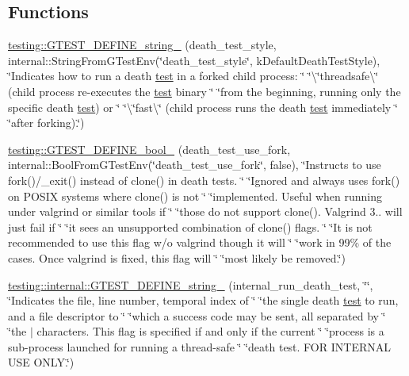 \subsection*{Functions}
\begin{DoxyCompactItemize}
\item 
\mbox{\hyperlink{namespacetesting_a62d8ec1eb3e20f20ed52604b0dfa3425}{testing\+::\+G\+T\+E\+S\+T\+\_\+\+D\+E\+F\+I\+N\+E\+\_\+string\+\_\+}} (death\+\_\+test\+\_\+style, internal\+::\+String\+From\+G\+Test\+Env(\char`\"{}death\+\_\+test\+\_\+style\char`\"{}, k\+Default\+Death\+Test\+Style), \char`\"{}Indicates how to run a death \mbox{\hyperlink{_mutual_8h_a707ee03719e99670bf6cfdfd897b8456}{test}} in a forked child process\+: \char`\"{} \char`\"{}\textbackslash{}\char`\"{}threadsafe\textbackslash{}\char`\"{} (child process re-\/executes the \mbox{\hyperlink{_mutual_8h_a707ee03719e99670bf6cfdfd897b8456}{test}} binary \char`\"{} \char`\"{}from the beginning, running only the specific death \mbox{\hyperlink{_mutual_8h_a707ee03719e99670bf6cfdfd897b8456}{test}}) or \char`\"{} \char`\"{}\textbackslash{}\char`\"{}fast\textbackslash{}\char`\"{} (child process runs the death \mbox{\hyperlink{_mutual_8h_a707ee03719e99670bf6cfdfd897b8456}{test}} immediately \char`\"{} \char`\"{}after forking).\char`\"{})
\item 
\mbox{\hyperlink{namespacetesting_a428e5944490e497df683cb8324ce4489}{testing\+::\+G\+T\+E\+S\+T\+\_\+\+D\+E\+F\+I\+N\+E\+\_\+bool\+\_\+}} (death\+\_\+test\+\_\+use\+\_\+fork, internal\+::\+Bool\+From\+G\+Test\+Env(\char`\"{}death\+\_\+test\+\_\+use\+\_\+fork\char`\"{}, false), \char`\"{}Instructs to use fork()/\+\_\+exit() instead of clone() in death tests. \char`\"{} \char`\"{}Ignored and always uses fork() on P\+O\+S\+IX systems where clone() is not \char`\"{} \char`\"{}implemented. Useful when running under valgrind or similar tools if \char`\"{} \char`\"{}those do not support clone(). Valgrind 3.. will just fail if \char`\"{} \char`\"{}it sees an unsupported combination of clone() flags. \char`\"{} \char`\"{}It is not recommended to use this flag w/o valgrind though it will \char`\"{} \char`\"{}work in 99\% of the cases. Once valgrind is fixed, this flag will \char`\"{} \char`\"{}most likely be removed.\char`\"{})
\item 
\mbox{\hyperlink{namespacetesting_1_1internal_a20bfd9d47d8dd167ffc1c37a4c9ff73e}{testing\+::internal\+::\+G\+T\+E\+S\+T\+\_\+\+D\+E\+F\+I\+N\+E\+\_\+string\+\_\+}} (internal\+\_\+run\+\_\+death\+\_\+test, \char`\"{}\char`\"{}, \char`\"{}Indicates the file, line number, temporal index of \char`\"{} \char`\"{}the single death \mbox{\hyperlink{_mutual_8h_a707ee03719e99670bf6cfdfd897b8456}{test}} to run, and a file descriptor to \char`\"{} \char`\"{}which a success code may be sent, all separated by \char`\"{} \char`\"{}the \textquotesingle{}$\vert$\textquotesingle{} characters.  This flag is specified if and only if the current \char`\"{} \char`\"{}process is a sub-\/process launched for running a thread-\/safe \char`\"{} \char`\"{}death test.  F\+OR I\+N\+T\+E\+R\+N\+AL U\+SE O\+N\+L\+Y.\char`\"{})
\end{DoxyCompactItemize}
